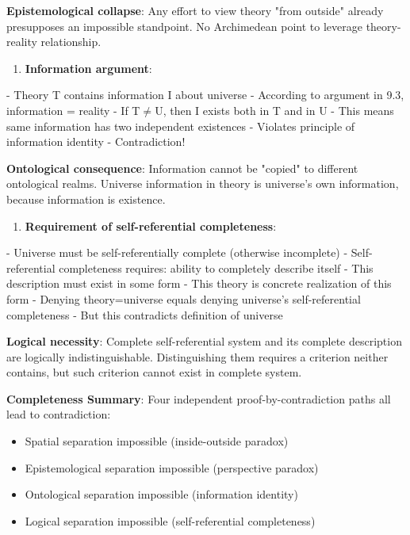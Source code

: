    \textbf{Epistemological collapse}: Any effort to view theory "from outside"
   already presupposes an impossible standpoint.
   No Archimedean point to leverage theory-reality relationship.

\begin{enumerate}
\item \textbf{Information argument}:
\end{enumerate}
   - Theory T contains information I about universe
   - According to argument in 9.3, information = reality
   - If T$\neq$U, then I exists both in T and in U
   - This means same information has two independent existences
   - Violates principle of information identity
   - Contradiction!
   
   \textbf{Ontological consequence}: Information cannot be "copied" to different ontological realms.
   Universe information in theory is universe's own information,
   because information is existence.

\begin{enumerate}
\item \textbf{Requirement of self-referential completeness}:
\end{enumerate}
   - Universe must be self-referentially complete (otherwise incomplete)
   - Self-referential completeness requires: ability to completely describe itself
   - This description must exist in some form
   - This theory is concrete realization of this form
   - Denying theory=universe equals denying universe's self-referential completeness
   - But this contradicts definition of universe
   
   \textbf{Logical necessity}: Complete self-referential system and its complete description
   are logically indistinguishable.
   Distinguishing them requires a criterion neither contains,
   but such criterion cannot exist in complete system.

\textbf{Completeness Summary}:
Four independent proof-by-contradiction paths all lead to contradiction:
\begin{itemize}
\item Spatial separation impossible (inside-outside paradox)
\item Epistemological separation impossible (perspective paradox)
\item Ontological separation impossible (information identity)
\item Logical separation impossible (self-referential completeness)
\end{itemize}

